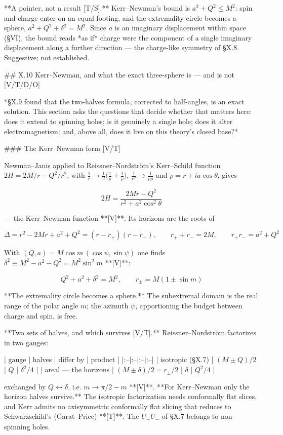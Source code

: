 **A pointer, not a result [T/S].** Kerr–Newman's bound is $a^2+Q^2\leq M^2$: spin and charge enter on an equal footing, and the extremality circle becomes a sphere, $a^2+Q^2+\delta^2 = M^2$. Since $a$ is an imaginary displacement within space (§VI), the bound reads *as if* charge were the component of a single imaginary displacement along a further direction — the charge-like symmetry of §X.8. Suggestive; not established.

## X.10 Kerr–Newman, and what the exact three-sphere is — and is not [V/T/D/O]

*§X.9 found that the two-halves formula, corrected to half-angles, is an exact solution. This section asks the questions that decide whether that matters here: does it extend to spinning holes; is it genuinely a single hole; does it alter electromagnetism; and, above all, does it live on this theory's closed base?*

### The Kerr–Newman form [V/T]

Newman–Janis applied to Reissner–Nordström's Kerr–Schild function $2H = 2M/r-Q^2/r^2$, with $\frac1r\to\frac12\big(\frac1\rho+\frac1{\bar\rho}\big)$, $\frac1{r^2}\to\frac{1}{\rho\bar\rho}$ and $\rho = r+ia\cos\theta$, gives

$$2H = \frac{2Mr-Q^2}{r^2+a^2\cos^2\theta}$$

— the Kerr–Newman function **[V]**. Its horizons are the roots of

$$\Delta = r^2-2Mr+a^2+Q^2 = (r-r_+)(r-r_-),\qquad r_++r_- = 2M,\qquad r_+r_- = a^2+Q^2$$

With $(Q,a) = M\cos m\,(\cos\psi,\sin\psi)$ one finds $\delta^2\equiv M^2-a^2-Q^2 = M^2\sin^2m$ **[V]**:

$$\boxed{\ Q^2+a^2+\delta^2 = M^2,\qquad r_\pm = M(1\pm\sin m)\ }$$

**The extremality circle becomes a sphere.** The subextremal domain is the real range of the polar angle $m$; the azimuth $\psi$, apportioning the budget between charge and spin, is free.

**Two sets of halves, and which survives [V/T].** Reissner–Nordström factorizes in two gauges:

| gauge | halves | differ by | product |
|:--|:--|:--|:--|
| isotropic (§X.7) | $(M\pm Q)/2$ | $Q$ | $\delta^2/4$ |
| areal — the horizons | $(M\pm\delta)/2 = r_\pm/2$ | $\delta$ | $Q^2/4$ |

exchanged by $Q\leftrightarrow\delta$, i.e. $m\to\pi/2-m$ **[V]**. **For Kerr–Newman only the horizon halves survive.** The isotropic factorization needs conformally flat slices, and Kerr admits no axisymmetric conformally flat slicing that reduces to Schwarzschild's (Garat–Price) **[T]**. The $U_+U_-$ of §X.7 belongs to non-spinning holes.

